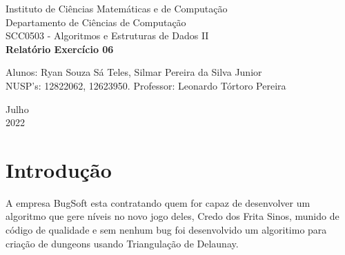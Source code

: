 \documentclass[a4paper, 12pt]{article}
\begin{document}

\begin{titlepage}
	\begin{center}
	

		\Huge{Instituto de Ciências Matemáticas e de Computação}\\
		\large{Departamento de Ciências de Computação}\\ 
		\large{SCC0503 - Algoritmos e Estruturas de Dados II}\\ 
		\vspace{15pt}
        \vspace{95pt}
        \textbf{\LARGE{Relatório Exercício 06}}\\
		\vspace{3,5cm}
	\end{center}
	
	\begin{flushleft}
		\begin{tabbing}
			Alunos: Ryan Souza Sá Teles, Silmar Pereira da Silva Junior \\
            NUSP's: 12822062, 12623950.
			Professor: Leonardo Tórtoro Pereira\\
	\end{tabbing}
 \end{flushleft}
	\vspace{1cm}
	
	\begin{center}
		\vspace{\fill}
			 Julho\\
		 2022
			\end{center}
\end{titlepage}

\newpage
\newpage
\tableofcontents
\thispagestyle{empty}

\newpage
{}
\section{Introdução}
A empresa BugSoft esta contratando quem for capaz de desenvolver um algoritmo que gere níveis no 
novo jogo deles, Credo dos Frita Sinos, munido de código de qualidade e sem nenhum bug foi 
desenvolvido um algoritimo para criação de dungeons usando Triangulação de Delaunay.
\end{document}
